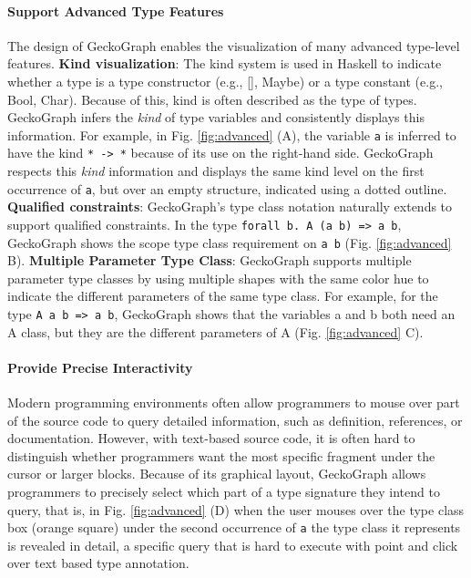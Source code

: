 \documentclass[preprint,12pt]{elsarticle}
\begin{document}
\paragraph{Support Advanced Type Features}
The design of GeckoGraph enables the visualization of many advanced type-level features. \textbf{Kind visualization}: The kind system \cite{Jones1995-lm} is used in Haskell to indicate whether a type is a type constructor (e.g., [], Maybe) or a type constant (e.g., Bool, Char). Because of this, kind is often described as the type of types. GeckoGraph infers the {\it kind} of type variables and consistently displays this information. For example, in Fig. \ref{fig:advanced} (A), the variable \texttt{a} is inferred to have the kind \texttt{* -> *} because of its use on the right-hand side. GeckoGraph respects this {\it kind} information and displays the same kind level on the first occurrence of \texttt{a}, but over an empty structure, indicated using a dotted outline. \textbf{Qualified constraints}: GeckoGraph's type class notation naturally extends to support qualified constraints. In the type \texttt{forall b. A (a b) => a b}, GeckoGraph shows the scope type class requirement on \texttt{a b} (Fig. \ref{fig:advanced} B).
\textbf{Multiple Parameter Type Class}:  GeckoGraph supports multiple parameter type classes by using multiple shapes with the same color hue to indicate the different parameters of the same type class. For example, for the type \texttt{A a b => a b},  GeckoGraph shows that the variables a and b both need an A class, but they are the different parameters of A (Fig. \ref{fig:advanced} C).

\paragraph{Provide Precise Interactivity}
Modern programming environments often allow programmers to mouse over part of the source code to query detailed information, such as definition, references, or documentation. However, with text-based source code, it is often hard to distinguish whether programmers want the most specific fragment under the cursor or larger blocks. Because of its graphical layout, GeckoGraph allows programmers to precisely select which part of a type signature they intend to query, that is, in Fig. \ref{fig:advanced} (D) when the user mouses over the type class box (orange square) under the second occurrence of \texttt{a} the type class it represents is revealed in detail, a specific query that is hard to execute with point and click over text based type annotation.
\end{document}
